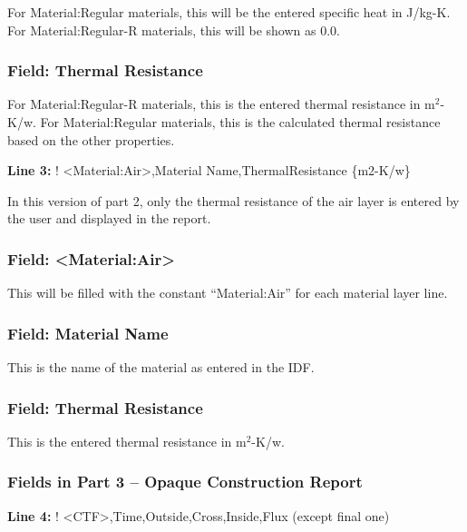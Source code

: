 For Material:Regular materials, this will be the entered specific heat in J/kg-K. For Material:Regular-R materials, this will be shown as 0.0.

\subsubsection{Field: Thermal Resistance}\label{field-thermal-resistance}

For Material:Regular-R materials, this is the entered thermal resistance in m\(^{2}\)-K/w. For Material:Regular materials, this is the calculated thermal resistance based on the other properties.

\textbf{Line 3:} ! \textless{}Material:Air\textgreater{},Material Name,ThermalResistance \{m2-K/w\}

In this version of part 2, only the thermal resistance of the air layer is entered by the user and displayed in the report.

\subsubsection{Field: \textless{}Material:Air\textgreater{}}\label{field-materialair}

This will be filled with the constant ``Material:Air'' for each material layer line.

\subsubsection{Field: Material Name}\label{field-material-name-1}

This is the name of the material as entered in the IDF.

\subsubsection{Field: Thermal Resistance}\label{field-thermal-resistance-1}

This is the entered thermal resistance in m\(^{2}\)-K/w.

\subsubsection{Fields in Part 3 -- Opaque Construction Report}\label{fields-in-part-3-opaque-construction-report}

\textbf{Line 4:} ! \textless{}CTF\textgreater{},Time,Outside,Cross,Inside,Flux (except final one)

